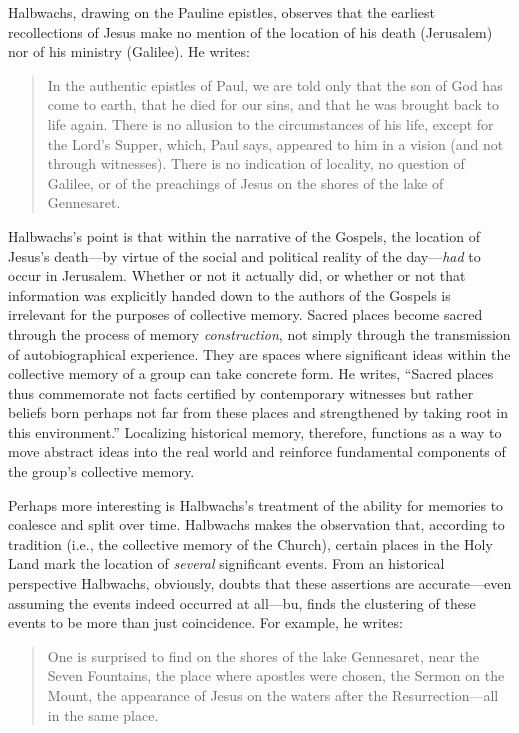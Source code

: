 Halbwachs, drawing on the Pauline epistles, observes that the earliest
recollections of Jesus make no mention of the location of his death
(Jerusalem) nor of his ministry (Galilee). He writes:

\begin{quote}
In the authentic epistles of Paul, we are told only that the son of God
has come to earth, that he died for our sins, and that he was brought
back to life again. There is no allusion to the circumstances of his
life, except for the Lord's Supper, which, Paul says, appeared to him in
a vision (and not through witnesses). There is no indication of
locality, no question of Galilee, or of the preachings of Jesus on the
shores of the lake of Gennesaret.\autocite[209]{halbwachs1992}
\end{quote}

Halbwachs's point is that within the narrative of the Gospels, the
location of Jesus's death---by virtue of the social and political
reality of the day---\emph{had} to occur in
Jerusalem.\autocite[211]{halbwachs1992} Whether or not it actually did,
or whether or not that information was explicitly handed down to the
authors of the Gospels is irrelevant for the purposes of collective
memory. Sacred places become sacred through the process of memory
\emph{construction}, not simply through the transmission of
autobiographical experience. They are spaces where significant ideas
within the collective memory of a group can take concrete form. He
writes, ``Sacred places thus commemorate not facts certified by
contemporary witnesses but rather beliefs born perhaps not far from
these places and strengthened by taking root in this
environment.''\autocite[199]{halbwachs1992} Localizing historical
memory, therefore, functions as a way to move abstract ideas into the
real world and reinforce fundamental components of the group's
collective memory.

Perhaps more interesting is Halbwachs's treatment of the ability for
memories to coalesce and split over time. Halbwachs makes the
observation that, according to tradition (i.e., the collective memory of
the Church), certain places in the Holy Land mark the location of
\emph{several} significant events. From an historical perspective
Halbwachs, obviously, doubts that these assertions are accurate---even
assuming the events indeed occurred at all---bu, finds the clustering of
these events to be more than just coincidence. For example, he writes:

\begin{quote}
One is surprised to find on the shores of the lake Gennesaret, near the
Seven Fountains, the place where apostles were chosen, the Sermon on the
Mount, the appearance of Jesus on the waters after the
Resurrection---all in the same place.\autocite[220]{halbwachs1992}
\end{quote}

